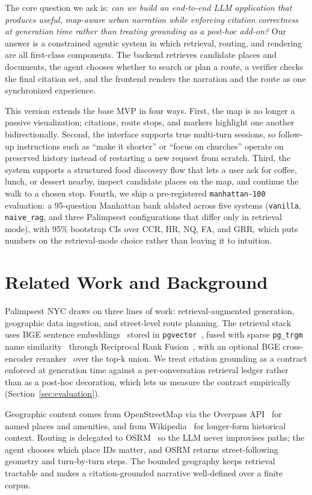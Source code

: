 \documentclass[sigconf,nonacm]{acmart}
\begin{document}
The core question we ask is: \emph{can we build an end-to-end LLM application that produces useful, map-aware urban narration while enforcing citation correctness at generation time rather than treating grounding as a post-hoc add-on?} Our answer is a constrained agentic system in which retrieval, routing, and rendering are all first-class components. The backend retrieves candidate places and documents, the agent chooses whether to search or plan a route, a verifier checks the final citation set, and the frontend renders the narration and the route as one synchronized experience.

This version extends the base MVP in four ways. First, the map is no longer a passive visualization; citations, route stops, and markers highlight one another bidirectionally. Second, the interface supports true multi-turn sessions, so follow-up instructions such as ``make it shorter'' or ``focus on churches'' operate on preserved history instead of restarting a new request from scratch. Third, the system supports a structured food discovery flow that lets a user ask for coffee, lunch, or dessert nearby, inspect candidate places on the map, and continue the walk to a chosen stop. Fourth, we ship a pre-registered \texttt{manhattan-100} evaluation: a 95-question Manhattan bank ablated across five systems (\texttt{vanilla}, \texttt{naive\_rag}, and three Palimpsest configurations that differ only in retrieval mode), with 95\% bootstrap CIs over CCR, HR, NQ, FA, and GRR, which puts numbers on the retrieval-mode choice rather than leaving it to intuition.

\section{Related Work and Background}
Palimpsest NYC draws on three lines of work: retrieval-augmented generation, geographic data ingestion, and street-level route planning. The retrieval stack uses BGE sentence embeddings~\cite{bge} stored in \texttt{pgvector}~\cite{pgvector}, fused with sparse \texttt{pg\_trgm} name similarity~\cite{pgtrgm} through Reciprocal Rank Fusion~\cite{rrf}, with an optional BGE cross-encoder reranker~\cite{bgereranker} over the top-k union. We treat citation grounding as a contract enforced at generation time against a per-conversation retrieval ledger rather than as a post-hoc decoration, which lets us measure the contract empirically (Section~\ref{sec:evaluation}).

Geographic content comes from OpenStreetMap via the Overpass API~\cite{overpass, osm} for named places and amenities, and from Wikipedia~\cite{wikipedia} for longer-form historical context. Routing is delegated to OSRM~\cite{osrm} so the LLM never improvises paths; the agent chooses which place IDs matter, and OSRM returns street-following geometry and turn-by-turn steps. The bounded geography keeps retrieval tractable and makes a citation-grounded narrative well-defined over a finite corpus.
\end{document}

